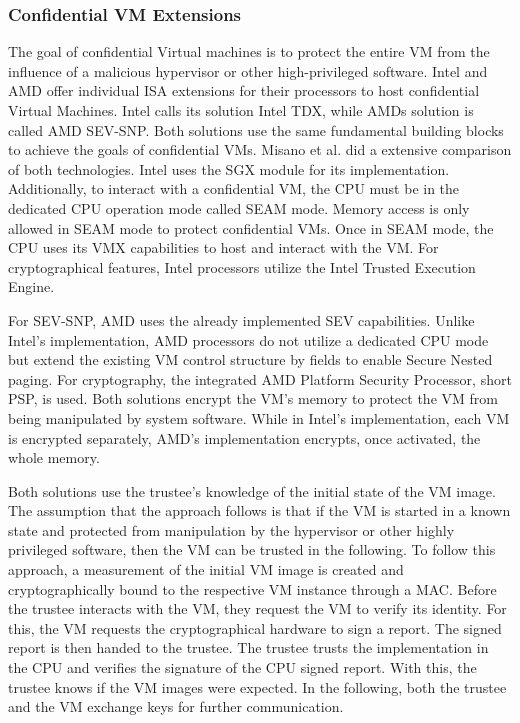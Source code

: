 \subsubsection{Confidential VM Extensions}
\label{section:20:confidential_vms}
The goal of confidential Virtual machines is to protect the entire VM from the influence of a malicious hypervisor or
other high-privileged software. Intel and AMD offer individual ISA extensions for their processors to host confidential
Virtual Machines. Intel calls its solution Intel TDX, while AMDs solution is called AMD
SEV-SNP.\cite{tdx_whitepaper,kaplan_amd_2020} Both solutions use the
same fundamental building blocks to achieve the goals of confidential VMs. Misano et al. did a extensive comparison of
both technologies.\cite{misono_confidential_2024}
Intel uses the SGX module for its implementation. Additionally, to interact with a confidential VM, the CPU must be in
the dedicated CPU operation mode
called SEAM mode. Memory access is only allowed in SEAM mode to protect confidential VMs. Once in SEAM mode, the CPU
uses its VMX capabilities to host and interact with the VM. For cryptographical features, Intel processors utilize the
Intel Trusted Execution Engine.

For SEV-SNP, AMD uses the already implemented SEV capabilities. Unlike Intel's implementation, AMD processors do not
utilize a dedicated CPU mode but extend the existing VM control structure by fields to enable Secure Nested paging. For
cryptography, the integrated AMD Platform Security Processor, short PSP, is used. Both solutions encrypt the VM's
memory to protect the VM from being manipulated by system software. While in Intel's implementation, each VM is
encrypted separately, AMD's implementation encrypts, once activated, the whole memory.

Both solutions use the trustee's knowledge of the initial state of the VM image. The assumption that the approach
follows is that if the VM is started in a known state and protected from manipulation by the hypervisor or other highly
privileged software, then the VM can be trusted in the following. To follow this approach, a measurement of the initial
VM image is created and cryptographically bound to the respective VM instance through a MAC. Before the trustee
interacts with the VM, they request the VM to verify its identity. For this, the VM requests the cryptographical
hardware to sign a report. The signed report is then handed to the trustee. The trustee trusts the implementation in
the CPU and verifies the signature of the CPU signed report. With this, the trustee knows if the VM images were
expected. In the following, both the trustee and the VM exchange keys for further communication.

